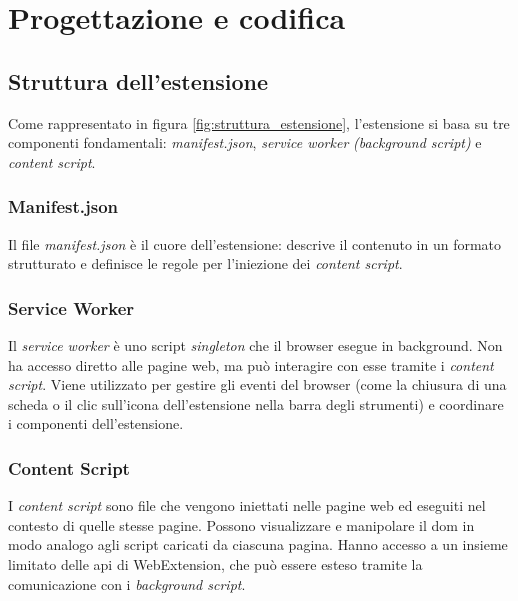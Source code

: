 \chapter{Progettazione e codifica}
\label{cap:progettazione-codifica}

\section{Struttura dell'estensione}
\label{sec:struttura-estensione}

\par Come rappresentato in figura \ref{fig:struttura_estensione}, l’estensione si basa su tre componenti fondamentali: \textit{manifest.json}, \textit{service worker} \textit{(background script)} e \textit{content script}.

\subsection{Manifest.json}

\par Il file \textit{manifest.json} è il cuore dell’estensione: descrive il contenuto in un formato strutturato e definisce le regole per l'iniezione dei \textit{content script}.

\subsection{Service Worker}

\par Il \textit{service worker} è uno script \textit{singleton} che il browser esegue in background. Non ha accesso diretto alle pagine web, ma può interagire con esse tramite i \textit{content script}. Viene utilizzato per gestire gli eventi del browser (come la chiusura di una scheda o il clic sull’icona dell’estensione nella barra degli strumenti) e coordinare i componenti dell'estensione.

\subsection{Content Script}

\par I \textit{content script} sono file che vengono iniettati nelle pagine web ed eseguiti nel contesto di quelle stesse pagine. Possono visualizzare e manipolare il \gls{dom} in modo analogo agli script caricati da ciascuna pagina. Hanno accesso a un insieme limitato delle \gls{api} di WebExtension, che può essere esteso tramite la comunicazione con i \textit{background script}.

